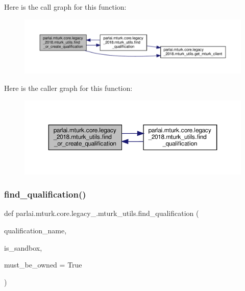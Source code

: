 Here is the call graph for this function\+:
\nopagebreak
\begin{figure}[H]
\begin{center}
\leavevmode
\includegraphics[width=350pt]{namespaceparlai_1_1mturk_1_1core_1_1legacy__2018_1_1mturk__utils_a17d5c7b74fb3c106c48edd07059cca9d_cgraph}
\end{center}
\end{figure}
Here is the caller graph for this function\+:
\nopagebreak
\begin{figure}[H]
\begin{center}
\leavevmode
\includegraphics[width=350pt]{namespaceparlai_1_1mturk_1_1core_1_1legacy__2018_1_1mturk__utils_a17d5c7b74fb3c106c48edd07059cca9d_icgraph}
\end{center}
\end{figure}
\mbox{\label{namespaceparlai_1_1mturk_1_1core_1_1legacy__2018_1_1mturk__utils_ad152f1d9ea255ea9f365695f56e0cc5f}} 
\subsubsection{\texorpdfstring{find\+\_\+qualification()}{find\_qualification()}}
{\footnotesize\ttfamily def parlai.\+mturk.\+core.\+legacy\+\_.\+mturk\+\_\+utils.\+find\+\_\+qualification (\begin{DoxyParamCaption}\item[{}]{qualification\+\_\+name,  }\item[{}]{is\+\_\+sandbox,  }\item[{}]{must\+\_\+be\+\_\+owned = {\ttfamily True} }\end{DoxyParamCaption})}

